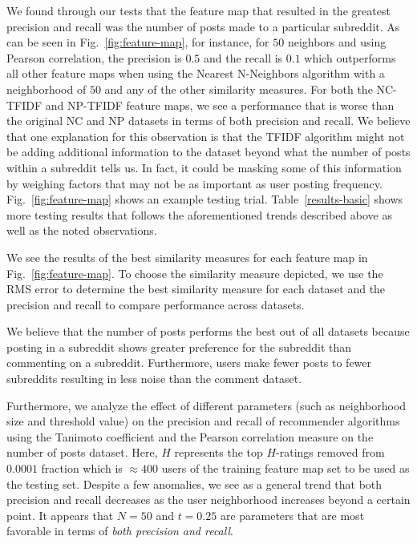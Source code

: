 \documentclass{article}
\begin{document}
We found through our tests that the feature map that resulted in the greatest precision and recall was the 
number of posts made to a particular subreddit. As can be seen in Fig.~\ref{fig:feature-map}, for instance,
for $50$ neighbors and using Pearson correlation, the precision is $0.5$ and the recall is $0.1$ which 
outperforms all other feature maps when using the Nearest N-Neighbors
algorithm with a neighborhood of $50$ and any of the other
similarity measures. For both the NC-TFIDF and NP-TFIDF feature maps, we see a performance
that is worse than the original NC and NP datasets in terms of both precision and recall. We 
believe that one explanation for this observation is that the TFIDF algorithm might not be adding
additional information to the dataset beyond what the number of posts within a subreddit 
tells us. In fact, it could be masking some of this information by weighing factors that may 
not be as important as user posting frequency. Fig.~\ref{fig:feature-map} shows an example
testing trial. Table~\ref{results-basic} shows more testing results that follows the aforementioned 
trends described above as well as the noted observations.

We see the results of the best similarity measures for each feature map
in Fig.~\ref{fig:feature-map}. To choose the similarity measure depicted, we use the RMS error to 
determine the best similarity measure for each dataset and the precision and recall to compare 
performance across datasets.

We believe that the number of posts performs the best out of all datasets because posting in a subreddit
shows greater preference for the subreddit than commenting on a subreddit. Furthermore, users
make fewer posts to fewer subreddits resulting in less noise than the comment dataset. 

Furthermore, we analyze the effect of different parameters (such as neighborhood size and threshold value)
on the precision and recall of recommender algorithms using 
 the Tanimoto coefficient and the Pearson correlation measure on the number of posts dataset. Here, 
 $H$ represents the top $H$-ratings removed from $0.0001$ fraction which is 
 $\approx 400$ users of the training feature map
 set to be used as the testing set. Despite a few anomalies, we see as a general trend that both
 precision and recall decreases as the user neighborhood increases beyond a certain point. It appears
 that $N = 50$ and $t = 0.25$ are parameters that are most favorable in terms of \emph{both precision
 and recall}.
 
\end{document}
